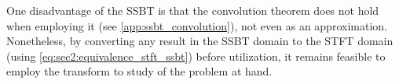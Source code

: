 One disadvantage of the SSBT is that the convolution theorem does not hold when employing it (see \cref{app:ssbt_convolution}), not even as an approximation. Nonetheless, by converting any result in the SSBT domain to the STFT domain (using \cref{eq:sec2:equivalence_stft_ssbt}) before utilization, it remains feasible to employ the transform to study of the problem at hand.